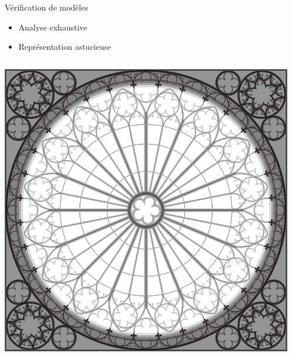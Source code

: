 \documentclass[xcolor={dvipsnames}]{beamer}
\begin{document}
\begin{frame}{Vérification de modèles}
  \begin{block}{}
    \begin{itemize}
    \item Analyse exhaustive
    \item Représentation astucieuse
    \end{itemize}
  \end{block}
  \begin{columns}
    \begin{column}{0.5\textwidth}
      \includegraphics[width=\textwidth]{media/rosace.jpg}
    \end{column}
    \begin{column}{0.5\textwidth}

\end{column}
\end{columns}
\end{frame}
\end{document}
